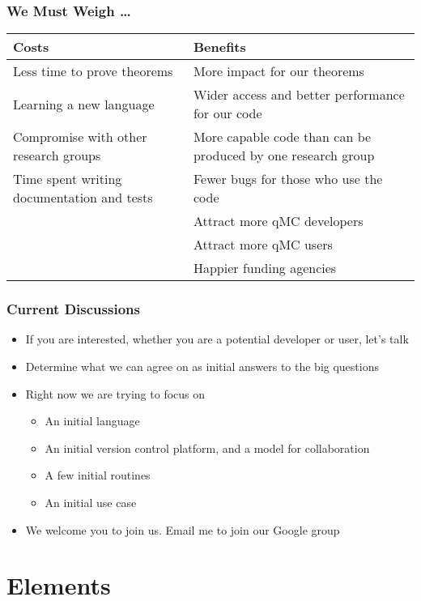 \documentclass[11pt,compress,xcolor={usenames,dvipsnames},aspectratio=169]{beamer}
\begin{document}
\begin{frame}
\frametitle{We Must Weigh \ldots}

\vspace{-7ex}

\setlength{\extrarowheight}{1ex}
\begin{tabular}
{p{}p{}}
\alert{\Large Costs} & \alert{\Large Benefits} \tabularnewline
\toprule
Less time to prove theorems &
More impact for our theorems \tabularnewline
Learning a new language & 
Wider access and better performance for our code \tabularnewline
Compromise with other research groups &
More capable code than can be produced by one research group \tabularnewline
Time spent writing documentation and tests &
Fewer bugs for those who use the code \tabularnewline
&
Attract more qMC developers \tabularnewline
&
Attract more qMC users \tabularnewline
&
Happier funding agencies \tabularnewline

\end{tabular}
\end{frame}

\begin{frame}
\frametitle{Current Discussions}
\begin{itemize}[<+-| alert@+>]
\item If you are interested, whether you are a potential developer or user, let's talk

\item Determine what we can agree on as initial answers to the big questions

\item Right now we are trying to focus on 
\begin{itemize}
\item An initial language

\item An initial version control platform, and a model for collaboration
\item A few initial routines
\item An initial use case
\end{itemize}

\item We welcome you to join us.  Email me to join our Google group

\end{itemize}

\end{frame}

\section{Elements}
\end{document}
